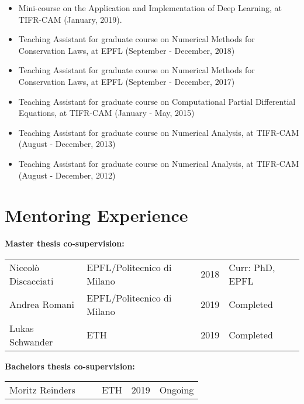 \documentclass[margin]{res}
\begin{document}
\begin{resume}
               \begin{itemize} \itemsep -2pt
               \item Mini-course on the Application and Implementation of Deep Learning, at TIFR-CAM (January, 2019).
               \item Teaching Assistant for graduate course on Numerical Methods for Conservation Laws, at EPFL (September - December, 2018)
                \item Teaching Assistant for graduate course on Numerical Methods for Conservation Laws, at EPFL (September - December, 2017)
               \item Teaching Assistant for graduate course on Computational Partial Differential Equations, at TIFR-CAM (January - May, 2015)
               \item Teaching Assistant for graduate course on Numerical Analysis, at TIFR-CAM  (August - December, 2013) 
               \item Teaching Assistant for graduate course on Numerical Analysis, at TIFR-CAM   (August - December, 2012)
               \end{itemize}          
               
\section{Mentoring Experience} 
               
                  \textbf{Master thesis co-supervision:}
                      \begin{table}[!h]
                       \begin{tabular}{llll}
                       Niccol\`{o} Discacciati & EPFL/Politecnico di Milano & 2018 & Curr: PhD, EPFL \\
                       Andrea Romani       & EPFL/Politecnico di Milano & 2019 & Completed                 \\
                       Lukas Schwander    & ETH                                         &  2019 &  Completed             
                        \end{tabular}
                        \end{table}
                        
                     \textbf{Bachelors thesis co-supervision:}
                      \begin{table}[!h]
                       \begin{tabular}{llll}
                       Moritz Reinders \ \ \ &  ETH                  \hspace{3.55cm}                       &  2019 &  Ongoing             
                        \end{tabular}
                        \end{table}   
                                    


\end{resume}
\end{document}
